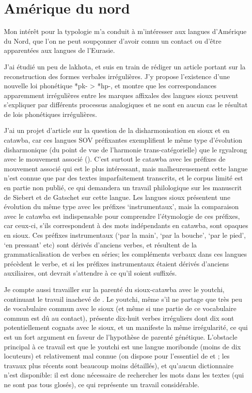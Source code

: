 \documentclass[oldfontcommands,oneside,a4paper,11pt]{memoir}
\begin{document}
\section{Amérique du nord}
Mon intérêt pour la typologie m'a conduit à m'intéresser aux langues d'Amérique du Nord, que l'on ne peut soupçonner d'avoir connu un contact ou d'être   apparentées aux langues de l'Eurasie.

J'ai étudié un peu de lakhota, et    suis en train de rédiger un article portant sur la reconstruction des formes verbales irrégulières. J'y propose l'existence d'une nouvelle loi phonétique *pk- > *hp-, et montre que les correspondances apparemment irrégulières entre les marques affixales des langues sioux peuvent s'expliquer par différents processus analogiques et ne sont en aucun cas le résultat de lois phonétiques irrégulières.  

J'ai un projet d'article sur la question de la disharmonisation en sioux et en catawba, car ces langues SOV préfixantes exemplifient le même type d'évolution disharmonique (du point de vue de l'harmonie trans-catégorielle) que le rgyalrong avec le mouvement associé (\citealt{jacques13harmonization}). C'est surtout le catawba avec les préfixes de mouvement associé qui est le plus intéressant, mais malheureusement cette langue n'est connue que par des textes imparfaitement transcrits, et le corpus limité est en partie non publié, ce qui demandera un travail philologique sur les manuscrit de Siebert et de Gatschet sur cette langue. Les langues sioux présentent une évolution du même type avec les préfixes `instrumentaux', mais la comparaison avec le catawba est indispensable pour comprendre l'étymologie de ces préfixes, car ceux-ci, s'ils correspondent à des mots indépendants en catawba, sont opaques en sioux. Ces préfixes instrumentaux (`par la main', `par la bouche', `par le pied', `en pressant' etc) sont dérivés d'anciens verbes, et résultent de la grammaticalisation de verbes en séries; les compléments verbaux dans ces langues précèdent le verbe, et si les préfixes instrumentaux étaient dérivés d'anciens auxiliaires, ont devrait s'attendre à ce qu'il soient suffixés.

Je compte aussi travailler sur la parenté du sioux-catawba avec le youtchi, continuant le travail inachevé de \citealt{ranking98yuchi}. Le youtchi, même s'il ne partage que très peu de vocabulaire commun avec le sioux (et même si une partie de ce vocabulaire commun est dû au contact), présente dix-huit verbes irréguliers dont dix sont potentiellement cognats avec le sioux, et un manifeste la même irrégularité, ce qui est un fort argument en faveur de l'hypothèse de parenté génétique. L'obstacle principal à ce travail est que le youtchi est une langue moribonde (moins de dix locuteurs) et relativement mal connue (on dispose pour l'essentiel de \citealt{wagner31tales} et  \citealt{wagner38yuchi}; les travaux plus récents sont beaucoup moins détaillés), et qu'aucun dictionnaire n'est disponible: il est donc nécessaire de rechercher les mots dans les textes (qui ne sont pas tous glosés), ce qui représente un travail considérable.
\end{document}
